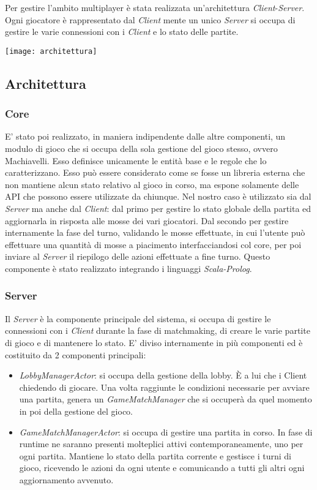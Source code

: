 Per gestire l'ambito multiplayer è stata realizzata un’architettura \textit{Client}-\textit{Server}.
Ogni giocatore è rappresentato dal \textit{Client} mente un unico \textit{Server} si occupa di gestire le varie connessioni con i \textit{Client} e lo stato delle partite.
\begin{center}
    \texttt{[image: architettura]}
\end{center}
\subsection[Architettura]{Architettura}
\subsubsection{Core}
E’ stato poi realizzato, in maniera indipendente dalle altre componenti, un modulo di gioco che si occupa della sola gestione del gioco stesso, ovvero Machiavelli.
Esso definisce unicamente le entità base e le regole che lo caratterizzano.\newline \newline
Esso può essere considerato come se fosse un libreria esterna che non mantiene alcun stato relativo al gioco in corso, ma espone solamente delle API che possono essere utilizzate da chiunque. \newline \newline
Nel nostro caso è utilizzato sia dal \textit{Server} ma anche dal \textit{Client}: dal primo per gestire lo stato globale della partita ed aggiornarla in risposta alle mosse dei vari giocatori. Dal secondo per gestire internamente la fase del turno, validando le mosse effettuate, in cui l’utente può effettuare una quantità di mosse a piacimento interfacciandosi col core, per poi inviare al \textit{Server} il riepilogo delle azioni effettuate a fine turno.
Questo componente è stato realizzato integrando i linguaggi \textit{Scala-Prolog}.
\subsubsection{Server}
Il \textit{Server} è la componente principale del sistema, si occupa di gestire le connessioni con i \textit{Client} durante la fase di matchmaking, di creare le varie partite di gioco e di mantenere lo stato.
E’ diviso internamente in più componenti ed è costituito da 2 componenti principali:
\begin{itemize}
    \item \textit{LobbyManagerActor}: si occupa della gestione della lobby.
    È a lui che i Client chiedendo di giocare.
    Una volta raggiunte le condizioni necessarie per avviare una partita, genera un \textit{GameMatchManager} che si occuperà da quel momento in poi della gestione del gioco.
    \item \textit{GameMatchManagerActor}: si occupa di gestire una partita in corso.
    In fase di runtime ne saranno presenti molteplici attivi contemporaneamente, uno per ogni partita.
    Mantiene lo stato della partita corrente e gestisce i turni di gioco, ricevendo le azioni da ogni utente e comunicando a tutti gli altri ogni aggiornamento avvenuto.
\end{itemize}
